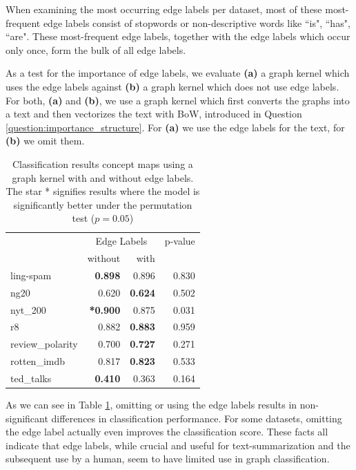 When examining the most occurring edge labels per dataset, most of these most-frequent edge labels consist of stopwords or non-descriptive words like ``is", ``has", ``are".
These most-frequent edge labels, together with the edge labels which occur only once, form the bulk of all edge labels.

As a test for the importance of edge labels, we evaluate \textbf{(a)} a graph kernel which uses the edge labels against \textbf{(b)} a graph kernel which does not use edge labels.
For both, \textbf{(a)} and \textbf{(b)}, we use a graph kernel which first converts the graphs into a text and then vectorizes the text with BoW, introduced in Question \ref{question:importance_structure}.
For \textbf{(a)} we use the edge labels for the text, for \textbf{(b)} we omit them.

\begin{table}[htb!]
	\centering
\begin{tabular}{lrrr}
	{} & \multicolumn{2}{c}{Edge Labels}  & p-value \\
	{}	& without & with & {} \\
	\midrule
		ling-spam       & \textbf{0.898} & 0.896 & 0.830 \\
		ng20            & 0.620 & \textbf{0.624} & 0.502 \\
		nyt\_200         & \textbf{*0.900} & 0.875 & 0.031 \\
		r8              & 0.882 & \textbf{0.883} & 0.959 \\
		review\_polarity & 0.700 & \textbf{0.727} & 0.271 \\
		rotten\_imdb     & 0.817 & \textbf{0.823} & 0.533 \\
		ted\_talks       & \textbf{0.410} & 0.363 & 0.164 \\
	\bottomrule
\end{tabular}
\caption[Results: Graph Kernel with and without edge labels]{Classification results concept maps using a graph kernel with and without edge labels.  The star * signifies results where the model is significantly better under the permutation test ($p = 0.05$)}\label{table:edge_label_classification}
\end{table}

As we can see in Table \ref{table:edge_label_classification}, omitting or using the edge labels results in non-significant differences in classification performance.
For some datasets, omitting the edge label actually even improves the classification score.
These facts all indicate that edge labels, while crucial and useful for text-summarization and the subsequent use by a human, seem to have limited use in graph classification.

